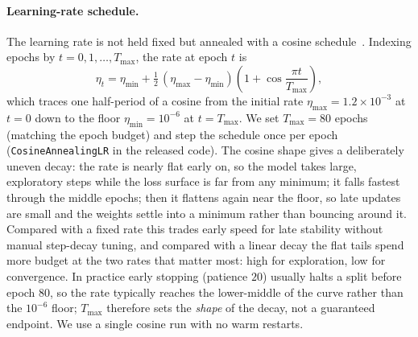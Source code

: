 \documentclass[sigconf,nonacm]{acmart}
\begin{document}
\paragraph{Learning-rate schedule.}
The learning rate is not held fixed but annealed with a cosine
schedule~\cite{loshchilov_sgdr_2017}. Indexing epochs by $t=0,1,\dots,T_{\max}$,
the rate at epoch $t$ is
\begin{equation}
\eta_t = \eta_{\min} + \tfrac{1}{2}\,(\eta_{\max} - \eta_{\min})
         \left(1 + \cos\!\frac{\pi t}{T_{\max}}\right),
\label{eq:cosine}
\end{equation}
which traces one half-period of a cosine from the initial rate
$\eta_{\max}=1.2\times10^{-3}$ at $t=0$ down to the floor
$\eta_{\min}=10^{-6}$ at $t=T_{\max}$. We set $T_{\max}=80$ epochs (matching
the epoch budget) and step the schedule once per epoch
(\texttt{CosineAnnealingLR} in the released code). The cosine shape gives a
deliberately uneven decay: the rate is nearly flat early on, so the model
takes large, exploratory steps while the loss surface is far from any
minimum; it falls fastest through the middle epochs; then it flattens again
near the floor, so late updates are small and the weights settle into a
minimum rather than bouncing around it. Compared with a fixed rate this
trades early speed for late stability without manual step-decay tuning, and
compared with a linear decay the flat tails spend more budget at the two
rates that matter most: high for exploration, low for convergence. In
practice early stopping (patience $20$) usually halts a split before epoch
$80$, so the rate typically reaches the lower-middle of the curve rather than
the $10^{-6}$ floor; $T_{\max}$ therefore sets the \emph{shape} of the decay,
not a guaranteed endpoint. We use a single cosine run with no warm restarts.
\end{document}
